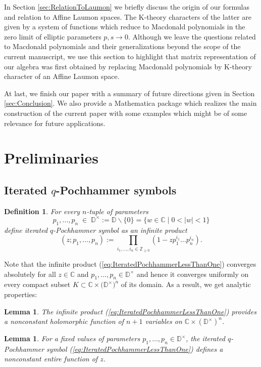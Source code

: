 \documentclass{amsart}
\newtheorem{definition}[theorem]{Definition}
\newtheorem{lemma}[theorem]{Lemma}
\begin{document}
In Section \ref{sec:RelationToLaumon} we briefly discuss the origin of our formulas and relation to Affine Laumon spaces. The K-theory characters of the latter are given by a system of functions which reduce to Macdonald polynomials in the zero limit of elliptic parameters $p,s\rightarrow 0$. Although we leave the questions related to Macdonald polynomials and their generalizations beyond the scope of the current manuscript, we use this section to highlight that matrix representation of our algebra was first obtained by replacing Macdonald polynomials by K-theory character of an Affine Laumon space.

At last, we finish our paper with a summary of future directions given in Section \ref{sec:Conclusion}. We also provide a Mathematica package \cite{ArthamonovShakirov'2023-GitHub-EllipticDAHA} which realizes the main construction of the current paper with some examples which might be of some relevance for future applications.

\section{Preliminaries}
\label{sec:Preliminaries}

\subsection{Iterated $q$-Pochhammer symbols}
\begin{definition}
For every $n$-tuple of parameters
\begin{equation}
p_1,\dots,p_n\;\in\; \mathbb D^\times:=\mathbb D\backslash\{0\}=\big\{w\in\mathbb C\;\big|\;0<|w|<1\big\}
\end{equation}
define iterated $q$-Pochhammer symbol as an infinite product
\begin{equation}
    (z;p_1,\dots,p_n):=\prod_{i_1,\dots,i_n\in\mathbb Z_{\geq0}}(1-z p_1^{i_1}\dots p_n^{i_n}).
    \label{eq:IteratedPochhammerLessThanOne}
\end{equation}
\label{def:IteratedPochhammerInfiniteProduct}
\end{definition}
Note that the infinite product  (\ref{eq:IteratedPochhammerLessThanOne}) converges absolutely for all $z\in\mathbb C$ and $p_1,\dots,p_n\in\mathbb D^\times$ and hence it converges uniformly on every compact subset $K\subset\mathbb C\times\big(\mathbb D^\times\big)^n$ of its domain. As a result, we get analytic properties:
\begin{lemma}
The infinite product (\ref{eq:IteratedPochhammerLessThanOne}) provides a nonconstant holomorphic function of $n+1$ variables on $\mathbb C\times\left(\mathbb D^\times\right)^n$.
\end{lemma}
\begin{lemma}
For a fixed values of parameters $p_1,\dots,p_n\in\mathbb D^\times$, the iterated $q$-Pochhammer symbol (\ref{eq:IteratedPochhammerLessThanOne}) defines a nonconstant entire function of $z$.
\label{lemm:PochhammerNonConstantEntire}
\end{lemma}
\end{document}
